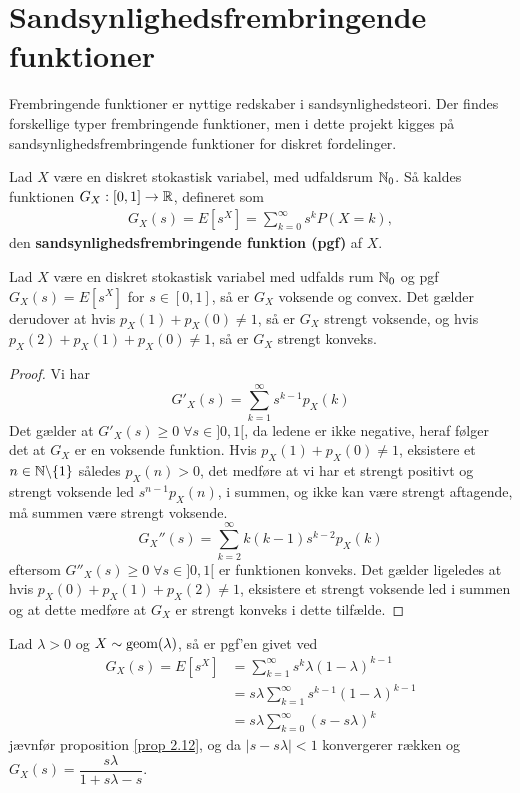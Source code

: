 \section{Sandsynlighedsfrembringende funktioner}
Frembringende funktioner er nyttige redskaber i sandsynlighedsteori. Der findes forskellige typer frembringende funktioner, men i dette projekt kigges på sandsynlighedsfrembringende funktioner for diskret fordelinger. 
\begin{defn} \label{pgf} %
    Lad $X$ være en diskret stokastisk variabel, med udfaldsrum $\mathbb{N}_0$. Så kaldes funktionen $G_{X}: [0, 1] \to \mathbb{R}$, defineret som
    \begin{align*}
        G_X(s)=E[s^X] = \sum_{k=0}^{\infty}s^k P(X=k),
    \end{align*}
    den \textbf{sandsynlighedsfrembringende funktion (pgf)} af $X$. 
\end{defn}
\begin{cor} \label{cor:egenskaberVedPGF} \label{problem133}
Lad $X$ være en diskret stokastisk variabel med udfalds rum $\mathbb{N}_0$ og pgf $G_X(s) = E[s^X]$ for $s \in [0, 1]$, så er $G_X$ voksende og convex. Det gælder derudover at hvis $p_X(1) + p_X(0) \neq 1$, så er $G_X$ strengt voksende, og hvis $p_X(2) + p_X(1) + p_X(0) \neq 1$, så er $G_X$ strengt konveks.
\end{cor}
\begin{proof}
Vi har 
\begin{equation*}
  G'_X(s) = \sum^\infty_{k = 1} s^{k - 1}p_X(k)
\end{equation*}
Det gælder at $G'_X(s) \geq 0 \; \forall s \in ]0, 1[$, da ledene er ikke negative, heraf følger det at $G_X$ er en voksende funktion. Hvis $p_X(1) + p_X(0) \neq 1$, eksistere et $n \in \mathbb{N} \backslash \{1\}$ således $p_X(n) > 0$, det medføre at vi har et strengt positivt og strengt voksende led $s^{n - 1}p_X(n)$, i summen, og ikke kan være strengt aftagende, må summen være strengt voksende.
\begin{equation*}
    G_X''(s) = \sum^\infty_{k = 2} k(k - 1) s^{k - 2} p_X(k)
\end{equation*}
eftersom $G''_X(s) \geq 0 \; \forall s \in ]0, 1[$ er funktionen konveks. Det gælder ligeledes at hvis $p_X(0) + p_X(1) + p_X(2) \neq 1$, eksistere et strengt voksende led i summen og at dette medføre at $G_X$ er strengt konveks i dette tilfælde. 
\end{proof}

\begin{exmp}\label{ex:geom-pgf}
Lad $\lambda > 0$ og $X\sim\textnormal{geom}(\lambda)$, så er pgf'en givet ved
\begin{align*}
    G_X(s)=E[s^X]&=\sum_{k=1}^\infty s^k \lambda(1-\lambda)^{k-1}\\
    &=s\lambda\sum_{k=1}^\infty s^{k-1}(1-\lambda)^{k-1}\\
    &=s\lambda\sum_{k=0}^\infty (s-s\lambda)^k
\end{align*}
jævnfør proposition \ref{prop 2.12}, og da $|s-s\lambda|<1$ konvergerer rækken og $G_X(s)=\dfrac{s\lambda}{1+s\lambda-s}$.
\end{exmp}

